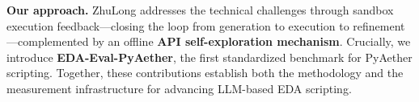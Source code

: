 \textbf{Our approach.} ZhuLong addresses the technical challenges through sandbox execution feedback—closing the loop from generation to execution to refinement—complemented by an offline \textbf{API self-exploration mechanism}. Crucially, we introduce \textbf{EDA-Eval-PyAether}, the first standardized benchmark for PyAether scripting. Together, these contributions establish both the methodology and the measurement infrastructure for advancing LLM-based EDA scripting.
